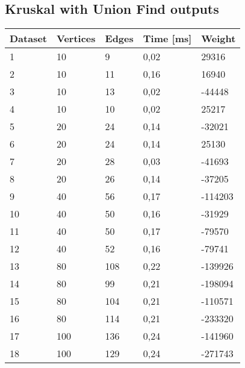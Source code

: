 \subsection{Kruskal with Union Find outputs}
\begin{longtable}{lllll}
    \textbf{Dataset} & \textbf{Vertices} & \textbf{Edges} & \textbf{Time [ms]} & \textbf{Weight} \\
    \endhead
    1                & 10             & 9              & 0,02     & 29316           \\
    2                & 10             & 11             & 0,16     & 16940           \\
    3                & 10             & 13             & 0,02     & -44448          \\
    4                & 10             & 10             & 0,02     & 25217           \\
    5                & 20             & 24             & 0,14     & -32021          \\
    6                & 20             & 24             & 0,14     & 25130           \\
    7                & 20             & 28             & 0,03     & -41693          \\
    8                & 20             & 26             & 0,14     & -37205          \\
    9                & 40             & 56             & 0,17     & -114203         \\
    10               & 40             & 50             & 0,16     & -31929          \\
    11               & 40             & 50             & 0,17     & -79570          \\
    12               & 40             & 52             & 0,16     & -79741          \\
    13               & 80             & 108            & 0,22     & -139926         \\
    14               & 80             & 99             & 0,21     & -198094         \\
    15               & 80             & 104            & 0,21     & -110571         \\
    16               & 80             & 114            & 0,21     & -233320         \\
    17               & 100            & 136            & 0,24     & -141960         \\
    18               & 100            & 129            & 0,24     & -271743         \\

\end{longtable}
